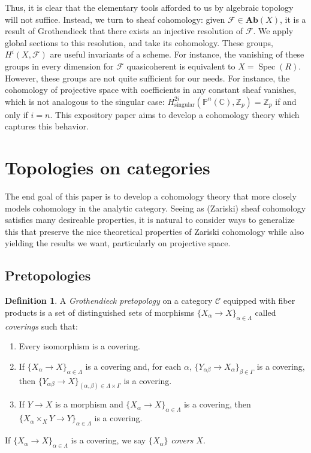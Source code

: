 \documentclass{amsart}
\newcommand{\Zz}{\mathbb{Z}}
\newcommand{\Ab}{\mathbf{Ab}}
\DeclareMathOperator{\Spec}{Spec}
\theoremstyle{definition}
\newtheorem{definition}[theorem]{Definition}
\theoremstyle{remark}
\begin{document}
Thus, it is clear that the elementary tools afforded to us by algebraic topology
will not suffice. Instead, we turn to sheaf cohomology: given $\mathcal{F} \in
\Ab(X)$, it is a result of Grothendieck that there exists an injective
resolution of $\mathcal{F}$. We apply global sections to this resolution, and
take its cohomology. These groups, $H^i(X, \mathcal{F})$ are useful invariants
of a scheme. For instance, the vanishing of these groups in every dimension for
$\mathcal{F}$ quasicoherent is equivalent to $X = \Spec(R)$.  However, these
groups are not quite sufficient for our needs. For instance, the cohomology of
projective space with coefficients in any constant sheaf vanishes, which is not
analogous to the singular case:
$H^{2i}_{\text{singular}}(\mathbb{P}^n(\mathbb{C}), \Zz_p) = \Zz_p$ if and only
if $i = n$. This expository paper aims to develop a cohomology theory which
captures this behavior.

\section{Topologies on categories}

The end goal of this paper is to develop a cohomology theory that more closely
models cohomology in the analytic category. Seeing as (Zariski) sheaf cohomology
satisfies many desireable properties, it is natural to consider ways to
generalize this that preserve the nice theoretical properties of Zariski
cohomology while also yielding the results we want, particularly on projective
space.

\subsection{Pretopologies}

\begin{definition}
    A \textit{Grothendieck pretopology} on a category $\mathcal{C}$ equipped
    with fiber products is a set of distinguished sets of morphisms $\{X_\alpha
    \to X\}_{\alpha \in \Lambda}$ called \textit{coverings} such that:
    \begin{enumerate}
        \item Every isomorphism is a covering.
        \item If $\{X_\alpha \to X\}_{\alpha \in \Lambda}$ is a covering and,
            for each $\alpha$, $\{Y_{\alpha \beta} \to X_\alpha\}_{\beta \in
                \Gamma}$ is a covering, then $\{Y_{\alpha \beta} \to
            X\}_{(\alpha, \beta) \in \Lambda \times \Gamma}$ is a covering.
        \item If $Y \to X$ is a morphism
            and $\{X_\alpha \to X\}_{\alpha \in
                \Lambda}$ is a covering, then $\{X_\alpha \times_{X} Y \to
            Y\}_{\alpha \in \Lambda}$ is a covering.
    \end{enumerate}
    If $\{X_\alpha \to X\}_{\alpha \in \Lambda}$ is a covering, we say
    $\{X_\alpha\}$ \textit{covers} $X$.
\end{definition}
\end{document}
